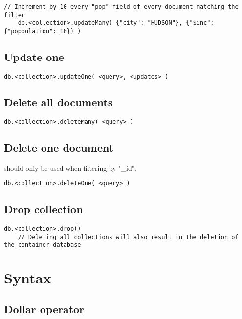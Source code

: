 \documentclass{article}
\begin{document}
\begin{lstlisting}[style=js]
    // Increment by 10 every "pop" field of every document matching the filter
    db.<collection>.updateMany( {"city": "HUDSON"}, {"$inc": {"popoulation": 10}} )
\end{lstlisting}

\subsection{Update one}

\begin{lstlisting}[style=js]
    db.<collection>.updateOne( <query>, <updates> )
\end{lstlisting}

\subsection{Delete all documents}

\begin{lstlisting}[style=js]
    db.<collection>.deleteMany( <query> )
\end{lstlisting}

\subsection{Delete one document}

should only be used when filtering by "\_id".

\begin{lstlisting}[style=js]
    db.<collection>.deleteOne( <query> )
\end{lstlisting}

\subsection{Drop collection}

\begin{lstlisting}[style=js]
    db.<collection>.drop()
    // Deleting all collections will also result in the deletion of the container database
\end{lstlisting}

\section{Syntax}

\subsection{Dollar operator}
\end{document}

